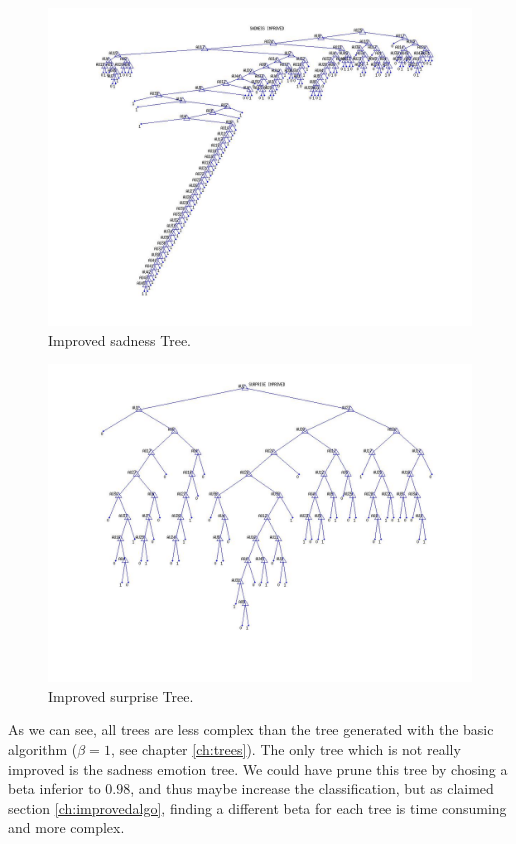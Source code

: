 \documentclass[a4paper,12pt,oneside,final]{report}
\newenvironment{changemargin}[2]{\begin{list}{}{%
\setlength{\topsep}{0pt}%
\setlength{\leftmargin}{0pt}%
\setlength{\rightmargin}{0pt}%
\setlength{\listparindent}{\parindent}%
\setlength{\itemindent}{\parindent}%
\setlength{\parsep}{0pt plus 1pt}%
\addtolength{\leftmargin}{#1}%
\addtolength{\rightmargin}{#2}%
}\item }{\end{list}}
\begin{document}
\begin{appendices}
\begin{figure}[!h]
\begin{changemargin}{-25mm}{-25mm}
\center
\includegraphics[scale=0.5]{sadness_improved.jpg}
\caption{Improved sadness Tree.}
\end{changemargin}
\end{figure}

\begin{figure}[!h]
\begin{changemargin}{-25mm}{-25mm}
\center
\includegraphics[scale=0.5]{surprise_improved.jpg}
\caption{Improved surprise Tree.}
\end{changemargin}
\end{figure}
\FloatBarrier
As we can see, all trees are less complex than the tree generated with the basic algorithm ($\beta = 1$, see chapter \ref{ch:trees}). The only tree which is not really improved is the sadness emotion tree. We could have prune this tree by chosing a beta inferior to $0.98$, and thus maybe increase the classification, but as claimed section \ref{ch:improvedalgo}, finding a different beta for each tree is time consuming and more complex.
\end{appendices}
\end{document}
